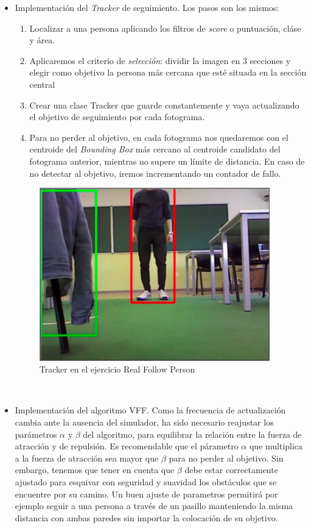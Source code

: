 \begin{itemize}
	\item Implementación del \textit{Tracker} de seguimiento. Los pasos son los mismos:
	\begin{enumerate}
		\item Localizar a una persona aplicando los filtros de \textit{score} o puntuación, cláse y área.
		\item Aplicaremos el criterio de \textit{selección}: dividir la imagen en 3 secciones y elegir como objetivo la persona más cercana que esté situada en la sección central
		\item Crear una clase Tracker que guarde constantemente y vaya actualizando el objetivo de seguimiento por cada fotograma.
		\item Para no perder al objetivo, en cada fotograma nos quedaremos con el centroide del \textit{Bounding Box} más cercano al centroide candidato del fotograma anterior, mientras no supere un límite de distancia. En caso de no detectar al objetivo, iremos incrementando un contador de fallo.
	\end{enumerate}
	\begin{figure} [H]
		\begin{center}
			\includegraphics[width=10cm]{imagenes/cap6/tracker.png}
		\end{center}
		\caption[Tracker en el ejercicio Real Follow Person]{Tracker en el ejercicio Real Follow Person}
		\label{fig:tracker_real_follow_person}
	\end{figure}\
	
	\item Implementación del algoritmo VFF. Como la frecuencia de actualización cambia ante la ausencia del simulador, ha sido necesario reajustar los parámetros $\alpha$ y $\beta$ del algoritmo, para equilibrar la relación entre la fuerza de atracción y de repulsión. Es recomendable que el párametro $\alpha$ que multiplica a la fuerza de atracción sea mayor que $\beta$ para no perder al objetivo. Sin embargo, tenemos que tener en cuenta que $\beta$ debe estar correctamente ajustado para esquivar con seguridad y suavidad los obstáculos que se encuentre por su camino. Un buen ajuste de parametros permitirá por ejemplo seguir a una persona a través de un pasillo manteniendo la misma distancia con ambas paredes sin importar la colocación de su objetivo.
	

\end{itemize}
